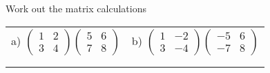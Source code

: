 \documentclass[fontsize=12pt]{scrartcl}
\begin{document}
\newpage
Work out the matrix calculations
\newline
\newline
\begin{tabular}{p{9cm}p{9cm}}
a) $\begin{pmatrix}1&2\\3&4 \end{pmatrix} \begin{pmatrix}5&6\\7&8 \end{pmatrix}$
&b) $\begin{pmatrix}1&-2\\3&-4 \end{pmatrix} \begin{pmatrix}-5&6\\-7&8 \end{pmatrix}$
\\\\\\

\end{tabular}
\end{document}
